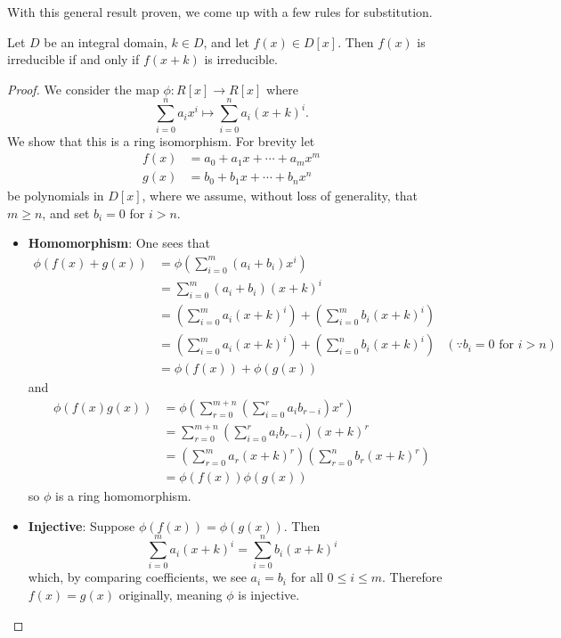 With this general result proven, we come up with a few rules for substitution.

\begin{corollary}\label{coro-irreducible-iff-translation-is-irreducible}
    Let $D$ be an integral domain, $k \in D$, and let $f(x) \in D[x]$. Then $f(x)$ is irreducible if and only if $f(x + k)$ is irreducible.
\end{corollary}
\begin{proof}
    We consider the map $\phi: R[x] \to R[x]$ where
    \[
        \sum_{i=0}^n a_ix^i \mapsto \sum_{i=0}^na_i(x+k)^i.  
    \]
    We show that this is a ring isomorphism. For brevity let
    \begin{align*}
        f(x) &= a_0 + a_1x + \cdots + a_mx^m\\
        g(x) &= b_0 + b_1x + \cdots + b_nx^n
    \end{align*}
    be polynomials in $D[x]$, where we assume, without loss of generality, that $m \geq n$, and set $b_i = 0$ for $i > n$.
    \begin{itemize}
        \item \textbf{Homomorphism}: One sees that
        \begin{align*}
            \phi(f(x) + g(x)) &= \phi\left(\sum_{i=0}^m(a_i+b_i)x^i\right)\\
            &= \sum_{i=0}^m(a_i+b_i)(x+k)^i\\
            &= \left(\sum_{i=0}^ma_i(x+k)^i\right) + \left(\sum_{i=0}^mb_i(x+k)^i\right)\\
            &= \left(\sum_{i=0}^ma_i(x+k)^i\right) + \left(\sum_{i=0}^nb_i(x+k)^i\right) & (\because b_i = 0 \text{ for } i > n)\\
            &= \phi(f(x)) + \phi(g(x))
        \end{align*}
        and
        \begin{align*}
            \phi(f(x)g(x)) &= \phi\left(\sum_{r=0}^{m+n}\left(\sum_{i=0}^ra_ib_{r-i}\right)x^r\right)\\
            &= \sum_{r=0}^{m+n}\left(\sum_{i=0}^ra_ib_{r-i}\right)(x+k)^r\\
            &= \left(\sum_{r=0}^ma_r(x+k)^r\right)\left(\sum_{r=0}^nb_r(x+k)^r\right)\\
            &= \phi(f(x))\phi(g(x))
        \end{align*}
        so $\phi$ is a ring homomorphism.
        
        \item \textbf{Injective}: Suppose $\phi(f(x)) = \phi(g(x))$. Then
        \[
            \sum_{i=0}^ma_i(x+k)^i = \sum_{i=0}^nb_i(x+k)^i
        \]
        which, by comparing coefficients, we see $a_i = b_i$ for all $0 \leq i \leq m$. Therefore $f(x) = g(x)$ originally, meaning $\phi$ is injective.
        

\end{itemize}
\end{proof}
